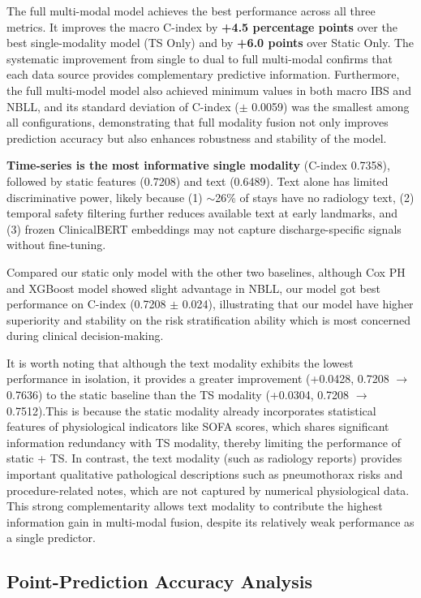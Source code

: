 \documentclass[10pt, a4paper]{article}
\begin{document}
The full multi-modal model achieves the best performance across all three metrics. It improves the macro C-index by \textbf{+4.5 percentage points} over the best single-modality model (TS Only) and by \textbf{+6.0 points} over Static Only. The systematic improvement from single to dual to full multi-modal confirms that each data source provides complementary predictive information. Furthermore, the full multi-model model also achieved minimum values in both macro IBS and NBLL, and its standard deviation of C-index ($\pm$ 0.0059) was the smallest among all configurations, demonstrating that full modality fusion not only improves prediction accuracy but also enhances robustness and stability of the model. 

\textbf{Time-series is the most informative single modality} (C-index 0.7358), followed by static features (0.7208) and text (0.6489). Text alone has limited discriminative power, likely because (1) $\sim$26\% of stays have no radiology text, (2) temporal safety filtering further reduces available text at early landmarks, and (3) frozen ClinicalBERT embeddings may not capture discharge-specific signals without fine-tuning. 

Compared our static only model with the other two baselines, although Cox PH and XGBoost model showed slight advantage in NBLL, our model got best performance on C-index (0.7208 $\pm$ 0.024), illustrating that our model have higher superiority and stability on the risk stratification ability which is most concerned during clinical decision-making.   

It is worth noting that although the text modality exhibits the lowest performance in isolation, it provides a greater improvement (+0.0428, 0.7208 $\to$ 0.7636) to the static baseline than the TS modality (+0.0304, 0.7208 $\to$ 0.7512).This is because the static modality already incorporates statistical features of physiological indicators like SOFA scores, which shares significant information redundancy with TS modality, thereby limiting the performance of static + TS. In contrast, the text modality (such as radiology reports) provides important qualitative pathological descriptions such as pneumothorax risks and procedure-related notes, which are not captured by numerical physiological data. This strong complementarity allows text modality to contribute the highest information gain in multi-modal fusion, despite its relatively weak performance as a single predictor.

\subsection{Point-Prediction Accuracy Analysis}
\end{document}
